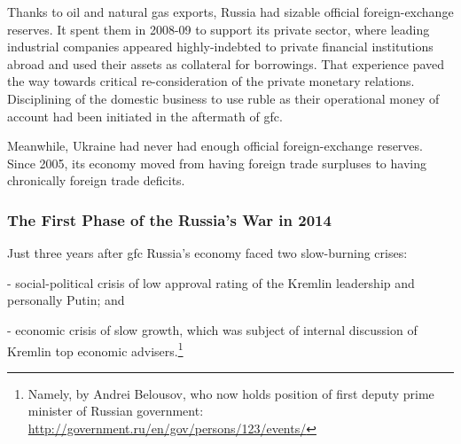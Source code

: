 Thanks to oil and natural gas exports, Russia had sizable official
foreign-exchange reserves. It spent them in 2008-09 to support its
private sector, where leading industrial companies appeared
highly-indebted to private financial institutions abroad and used their
assets as collateral for borrowings. That experience paved the way
towards critical re-consideration of the private monetary relations.
Disciplining of the domestic business to use ruble as their operational
money of account had been initiated in the aftermath of \ac{gfc}.

Meanwhile, Ukraine had never had enough official foreign-exchange
reserves. Since 2005, its economy moved from having foreign trade
surpluses to having chronically foreign trade deficits.

\subsubsection{The First Phase of the Russia's War in 2014}

Just three years after \ac{gfc} Russia's economy faced two slow-burning
crises:

-   social-political crisis of low approval rating of the Kremlin
    leadership and personally Putin; and

-   economic crisis of slow growth, which was subject of internal
    discussion of Kremlin top economic advisers.\footnote{Namely, by Andrei Belousov, who now holds position of first deputy prime minister of Russian government: \url{http://government.ru/en/gov/persons/123/events/}}

